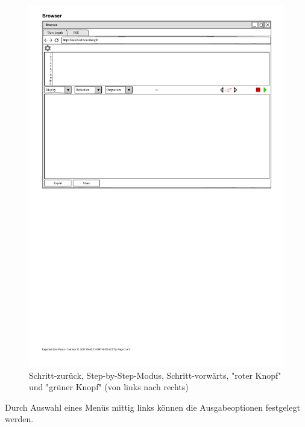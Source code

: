 \documentclass[parskip=full,11pt,twoside]{scrartcl}
\begin{document}
\begin{figure}[H]
	\centering
	\includegraphics{img/actionButton}
	\caption{\label{fig:actionButtons} Schritt-zurück, Step-by-Step-Modus, Schritt-vorwärts, "roter Knopf" und "grüner Knopf" (von links nach rechts)}
\end{figure}

Durch Auswahl eines Menüs mittig links können die Ausgabeoptionen festgelegt werden. 
\end{document}
